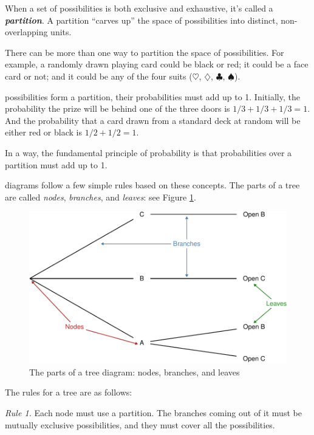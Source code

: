 \documentclass[justified]{tufte-book}
\theoremstyle{definition}
\theoremstyle{definition}
\theoremstyle{definition}
\theoremstyle{remark}
\begin{document}
When a set of possibilities is both exclusive and exhaustive, it's
called a \textbf{\emph{partition}}. A partition ``carves up'' the space
of possibilities into distinct, non-overlapping units.

There can be more than one way to partition the space of possibilities.
For example, a randomly drawn playing card could be black or red; it
could be a face card or not; and it could be any of the four suits
(\(\heartsuit\), \(\diamondsuit\), \(\clubsuit\), \(\spadesuit\)).

 possibilities form a partition, their probabilities
must add up to 1. Initially, the probability the prize will be behind
one of the three doors is \(1/3 + 1/3 + 1/3 = 1\). And the probability
that a card drawn from a standard deck at random will be either red or
black is \(1/2 + 1/2 = 1\).

In a way, the fundamental principle of probability is that probabilities
over a partition must add up to 1.

 diagrams follow a few simple rules based on these
concepts. The parts of a tree are called \emph{nodes}, \emph{branches},
and \emph{leaves}: see Figure \ref{fig:treeparts}.

\begin{figure}
\includegraphics{_main_files/figure-latex/treeparts-1} \caption[The parts of a tree diagram]{The parts of a tree diagram: nodes, branches, and leaves}\label{fig:treeparts}
\end{figure}

The rules for a tree are as follows:

\emph{Rule 1.} Each node must use a partition. The branches coming out
of it must be mutually exclusive possibilities, and they must cover all
the possibilities.
\end{document}
